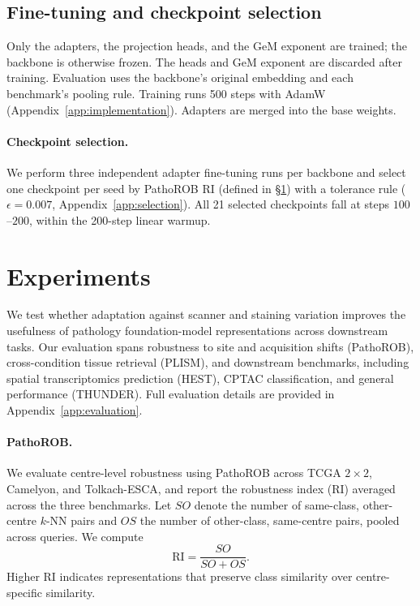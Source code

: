 \documentclass{article}
\begin{document}
\subsection{Fine-tuning and checkpoint selection}

Only the adapters, the projection heads, and the GeM exponent are trained; the backbone is
otherwise frozen. The heads and GeM exponent are discarded after training. Evaluation uses the
backbone's original embedding and each benchmark's pooling rule. Training runs 500 steps with
AdamW \citep{adamw} (Appendix~\ref{app:implementation}). Adapters are merged into the base
weights.

\paragraph{Checkpoint selection.}\label{sec:selection}
We perform three independent adapter fine-tuning runs per backbone and select one checkpoint per seed by PathoROB RI
(defined in \S\ref{sec:experiments}) with a tolerance rule ($\epsilon=0.007$, Appendix~\ref{app:selection}). All 21 selected checkpoints fall at steps $100$--$200$, within the 200-step linear warmup.


\section{Experiments}
\label{sec:experiments}

We test whether adaptation against scanner and staining variation improves the usefulness of pathology foundation-model representations across downstream tasks. Our evaluation spans robustness to site and acquisition shifts (PathoROB), cross-condition tissue retrieval (PLISM), and downstream benchmarks, including spatial transcriptomics prediction (HEST), CPTAC classification, and general performance (THUNDER). Full evaluation details are provided in Appendix~\ref{app:evaluation}.

\paragraph{PathoROB.}
We evaluate centre-level robustness using PathoROB across TCGA $2\times2$, Camelyon, and Tolkach-ESCA, and report the robustness index (RI) averaged across the three benchmarks. Let $SO$ denote the number of same-class, other-centre $k$-NN pairs and $OS$ the number of other-class, same-centre pairs, pooled across queries. We compute
\begin{equation}
\mathrm{RI} = \frac{SO}{SO+OS}.
\end{equation}
Higher RI indicates representations that preserve class similarity over centre-specific similarity.
\end{document}
